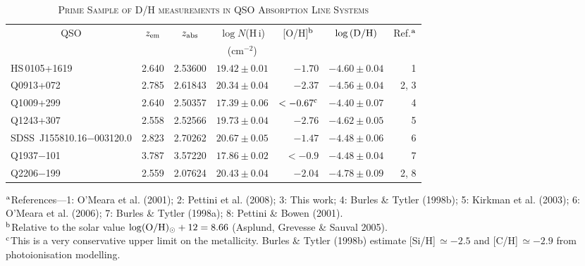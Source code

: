 \documentclass[useAMS,usenatbib]{mn2e}
\begin{document}
\begin{table}
\centering
\begin{minipage}[c]{0.7\textwidth}
    \caption{\textsc{Prime Sample of D/H measurements in QSO Absorption Line Systems}}
    \begin{tabular}{@{}lrrrrrr}
    \hline
   \multicolumn{1}{c}{QSO}
& \multicolumn{1}{c}{$z_{\rm em}$}
& \multicolumn{1}{c}{$z_{\rm abs}$}
& \multicolumn{1}{c}{$\log N$\/(H\,{\sc i})}
& \multicolumn{1}{c}{[O/H]$^{\rm b}$}
& \multicolumn{1}{c}{$\log {\rm (D/H)}$}
& \multicolumn{1}{c}{Ref.$^{\rm a}$}\\
    \multicolumn{1}{c}{}
& \multicolumn{1}{c}{}
& \multicolumn{1}{c}{}
& \multicolumn{1}{c}{(cm$^{-2}$)}
& \multicolumn{1}{c}{}
& \multicolumn{1}{c}{}
& \multicolumn{1}{c}{}\\
  \hline
HS\,0105+1619                      & 2.640     &  2.53600   & $19.42 \pm 0.01$   & $-1.70$                   &  $-4.60 \pm 0.04$    &  1 \\
Q0913+072                             & 2.785     &  2.61843   & $20.34 \pm 0.04$   & $-2.37$                   &  $-4.56 \pm 0.04$    &  2, 3 \\
Q1009+299                             & 2.640     &  2.50357   & $17.39 \pm 0.06$   & $< -0.67^{\rm c}$  &  $-4.40 \pm 0.07$    &  4 \\
Q1243+307                           & 2.558     &  2.52566   & $19.73 \pm 0.04$   & $-2.76$                   &  $-4.62 \pm 0.05$    &  5 \\
SDSS~J155810.16$-$003120.0  & 2.823     & 2.70262   & $20.67 \pm 0.05$    & $-1.47$                   & $-4.48 \pm 0.06$     &  6  \\
Q1937$-$101                          & 3.787     & 3.57220    & $17.86 \pm 0.02$   & $ < -0.9$                  & $-4.48 \pm 0.04$    & 7 \\
Q2206$-$199                          & 2.559     & 2.07624    & $20.43 \pm 0.04$   & $-2.04$                    & $-4.78 \pm 0.09$    & 2, 8 \\
   \hline
    \end{tabular}
    \smallskip

$^{\rm a}${References---1: O'Meara et al. (2001);
2: Pettini et al. (2008);
3: This work;
4: Burles \& Tytler (1998b);
5: Kirkman et al. (2003);
6: O'Meara et al. (2006);
7: Burles \& Tytler (1998a);
8: Pettini \& Bowen (2001).
}\\
$^{\rm b}${Relative to the solar value $\log ({\rm O/H})_{\odot} + 12 = 8.66$ (Asplund, Grevesse \& Sauval 2005).}\\
$^{\rm c}${This is a very conservative upper limit on the metallicity. Burles \& Tytler (1998b)
estimate [Si/H]\,$\simeq -2.5$ and [C/H]\,$\simeq -2.9$ from photoionisation modelling.
}\\
    \label{tab:DtoH}
\end{minipage}
\end{table}
\end{document}
